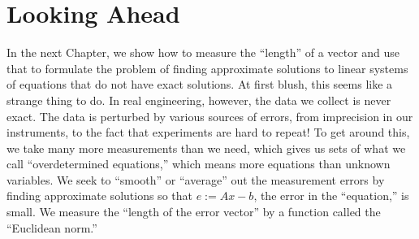 \section{Looking Ahead}

In the next Chapter, we show how to measure the ``length'' of a vector and use that to formulate the problem of finding approximate solutions to linear systems of equations that do not have exact solutions. At first blush, this seems like a strange thing to do. In real engineering, however, the data we collect is never exact. The data is perturbed by various sources of errors, from imprecision in our instruments, to the fact that experiments are hard to repeat! To get around this, we take many more measurements than we need, which gives us sets of what we call ``overdetermined equations,'' which means more equations than unknown variables. We seek to ``smooth'' or ``average'' out the measurement errors by finding approximate solutions so that $e:=Ax-b$, the error in the ``equation,'' is small. We measure the ``length of the error vector'' by a function called the ``Euclidean norm.''
